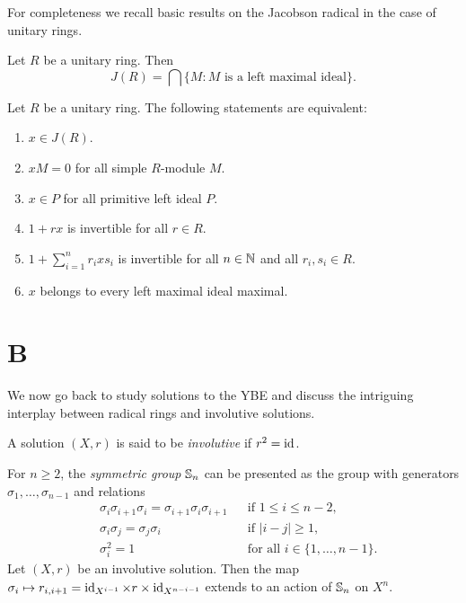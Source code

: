 For completeness we recall basic results on the Jacobson radical in the case
of unitary rings. 

\begin{exercise}
	Let $R$ be a unitary ring. Then  
	\[
	J(R)=\bigcap\{M:\text{$M$ is a left maximal ideal}\}.
	\]
\end{exercise}

\begin{exercise}
	Let $R$ be a unitary ring. The
	following statements are equivalent: 
	\begin{enumerate}
		\item $x\in J(R)$.
		\item $xM=0$ for all simple $R$-module $M$.
		\item $x\in P$ for all primitive left ideal $P$.
		\item $1+rx$ is invertible for all $r\in R$.
		\item $1+\sum_{i=1}^n r_ixs_i$ is invertible for all $n\in\mathbb{N}$ and all $r_i,s_i\in R$.
		\item $x$ belongs to every left maximal ideal maximal. 
	\end{enumerate}
\end{exercise}

\section*{B}

We now go back to study solutions to the YBE and discuss the intriguing interplay
between radical rings and involutive solutions. 

\begin{definition}
A solution $(X,r)$ is said to be \emph{involutive} if $r^2=\operatorname{id}$. 
\end{definition}

For $n\geq2$, the \emph{symmetric group} $\mathbb{S}_n$ can be presented 
as the group with generators $\sigma_1,\dots,\sigma_{n-1}$ and relations
\begin{align*}
    &\sigma_i\sigma_{i+1}\sigma_i=\sigma_{i+1}\sigma_i\sigma_{i+1} && \text{if }1\leq i\leq n-2,\\
    &\sigma_i\sigma_j=\sigma_j\sigma_i && \text{if }|i-j|\geq 1,\\
    &\sigma_i^2=1 && \text{for all $i\in\{1,\dots,n-1\}$}.
\end{align*}
Let $(X,r)$ be an involutive solution. 
Then the map $\sigma_i\mapsto r_{i,i+1}=\operatorname{id}_{X^{i-1}}\times r\times\operatorname{id}_{X^{n-i-1}}$ extends 
to an action of $\mathbb{S}_n$ on $X^n$.

